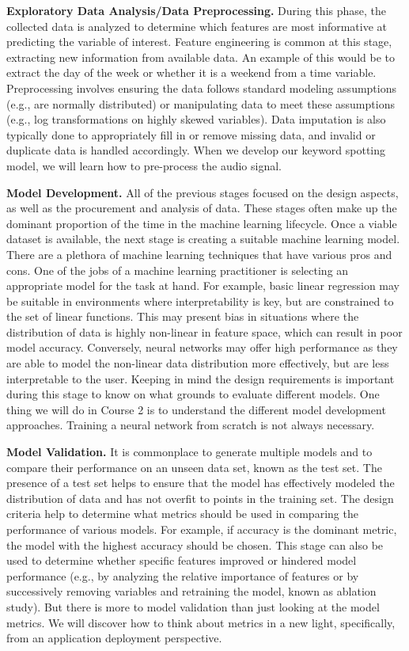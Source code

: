 \textbf{Exploratory Data Analysis/Data Preprocessing.} During this phase, the collected data is analyzed to determine which features are most informative at predicting the variable of interest. Feature engineering is common at this stage, extracting new information from available data. An example of this would be to extract the day of the week or whether it is a weekend from a time variable. Preprocessing involves ensuring the data follows standard modeling assumptions (e.g., are normally distributed) or manipulating data to meet these assumptions (e.g., log transformations on highly skewed variables). Data imputation is also typically done to appropriately fill in or remove missing data, and invalid or duplicate data is handled accordingly. When we develop our keyword spotting model, we will learn how to pre-process the audio signal.

\textbf{Model Development.} All of the previous stages focused on the design aspects, as well as the procurement and analysis of data. These stages often make up the dominant proportion of the time in the machine learning lifecycle. Once a viable dataset is available, the next stage is creating a suitable machine learning model. There are a plethora of machine learning techniques that have various pros and cons. One of the jobs of a machine learning practitioner is selecting an appropriate model for the task at hand. For example, basic linear regression may be suitable in environments where interpretability is key, but are constrained to the set of linear functions. This may present bias in situations where the distribution of data is highly non-linear in feature space, which can result in poor model accuracy. Conversely, neural networks may offer high performance as they are able to model the non-linear data distribution more effectively, but are less interpretable to the user. Keeping in mind the design requirements is important during this stage to know on what grounds to evaluate different models. One thing we will do in Course 2 is to understand the different model development approaches. Training a neural network from scratch is not always necessary.

\textbf{Model Validation.} It is commonplace to generate multiple models and to compare their performance on an unseen data set, known as the test set. The presence of a test set helps to ensure that the model has effectively modeled the distribution of data and has not overfit to points in the training set. The design criteria help to determine what metrics should be used in comparing the performance of various models. For example, if accuracy is the dominant metric, the model with the highest accuracy should be chosen. This stage can also be used to determine whether specific features improved or hindered model performance (e.g., by analyzing the relative importance of features or by successively removing variables and retraining the model, known as ablation study). But there is more to model validation than just looking at the model metrics. We will discover how to think about metrics in a new light, specifically, from an application deployment perspective. 

